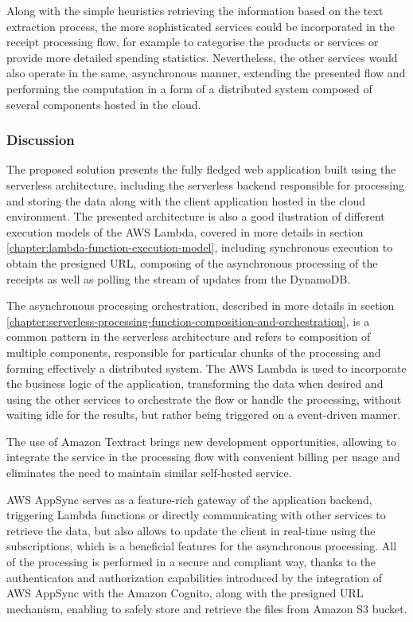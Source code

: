 Along with the simple heuristics retrieving the information based on the text extraction process, the more sophisticated services could be incorporated in the receipt processing flow, for example to categorise the products or services or provide more detailed spending statistics. Nevertheless, the other services would also operate in the same, asynchronous manner, extending the presented flow and performing the computation in a form of a distributed system composed of several components hosted in the cloud.

\subsubsection{Discussion}

The proposed solution presents the fully fledged web application built using the serverless architecture, including the serverless backend responsible for processing and storing the data along with the client application hosted in the cloud environment. 
The presented architecture is also a good ilustration of different execution models of the AWS Lambda, covered in more details in section \ref{chapter:lambda-function-execution-model}, including synchronous execution to obtain the presigned URL, composing of the asynchronous processing of the receipts as well as polling the stream of updates from the DynamoDB.

The asynchronous processing orchestration, described in more details in section \ref{chapter:serverless-processing-function-composition-and-orchestration}, is a common pattern in the serverless architecture and refers to composition of multiple components, responsible for particular chunks of the processing and forming effectively a distributed system.
The AWS Lambda is used to incorporate the business logic of the application, transforming the data when desired and using the other services to orchestrate the flow or handle the processing, without waiting idle for the results, but rather being triggered on a event-driven manner.

The use of Amazon Textract brings new development opportunities, allowing to integrate the service in the processing flow with convenient billing per usage and eliminates the need to maintain similar self-hosted service.

AWS AppSync serves as a feature-rich gateway of the application backend, triggering Lambda functions or directly communicating with other services to retrieve the data, but also allows to update the client in real-time using the subscriptions, which is a beneficial features for the asynchronous processing.
All of the processing is performed in a secure and compliant way, thanks to the authenticaton and authorization capabilities introduced by the integration of AWS AppSync with the Amazon Cognito, along with the presigned URL mechanism, enabling to safely store and retrieve the files from Amazon S3 bucket.

